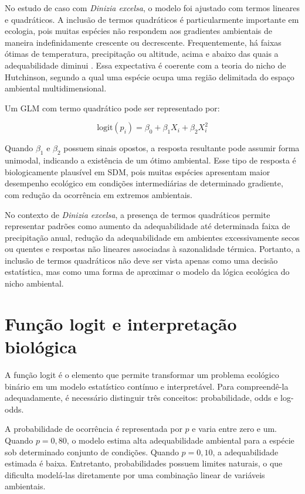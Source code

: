 No estudo de caso com \textit{Dinizia excelsa}, o modelo foi ajustado com termos lineares e quadráticos. A inclusão de termos quadráticos é particularmente importante em ecologia, pois muitas espécies não respondem aos gradientes ambientais de maneira indefinidamente crescente ou decrescente. Frequentemente, há faixas ótimas de temperatura, precipitação ou altitude, acima e abaixo das quais a adequabilidade diminui \citep{austin2002spatial,guisan2002generalized}. Essa expectativa é coerente com a teoria do nicho de Hutchinson, segundo a qual uma espécie ocupa uma região delimitada do espaço ambiental multidimensional.

Um GLM com termo quadrático pode ser representado por:

\begin{equation}
	\text{logit}(p_i) =
	\beta_0 + \beta_1X_i + \beta_2X_i^2
\end{equation}

Quando $\beta_1$ e $\beta_2$ possuem sinais opostos, a resposta resultante pode assumir forma unimodal, indicando a existência de um ótimo ambiental. Esse tipo de resposta é biologicamente plausível em SDM, pois muitas espécies apresentam maior desempenho ecológico em condições intermediárias de determinado gradiente, com redução da ocorrência em extremos ambientais.

No contexto de \textit{Dinizia excelsa}, a presença de termos quadráticos permite representar padrões como aumento da adequabilidade até determinada faixa de precipitação anual, redução da adequabilidade em ambientes excessivamente secos ou quentes e respostas não lineares associadas à sazonalidade térmica. Portanto, a inclusão de termos quadráticos não deve ser vista apenas como uma decisão estatística, mas como uma forma de aproximar o modelo da lógica ecológica do nicho ambiental.

\section{Função logit e interpretação biológica}

A função logit é o elemento que permite transformar um problema ecológico binário em um modelo estatístico contínuo e interpretável. Para compreendê-la adequadamente, é necessário distinguir três conceitos: probabilidade, odds e log-odds.

A probabilidade de ocorrência é representada por $p$ e varia entre zero e um. Quando $p = 0{,}80$, o modelo estima alta adequabilidade ambiental para a espécie sob determinado conjunto de condições. Quando $p = 0{,}10$, a adequabilidade estimada é baixa. Entretanto, probabilidades possuem limites naturais, o que dificulta modelá-las diretamente por uma combinação linear de variáveis ambientais.

